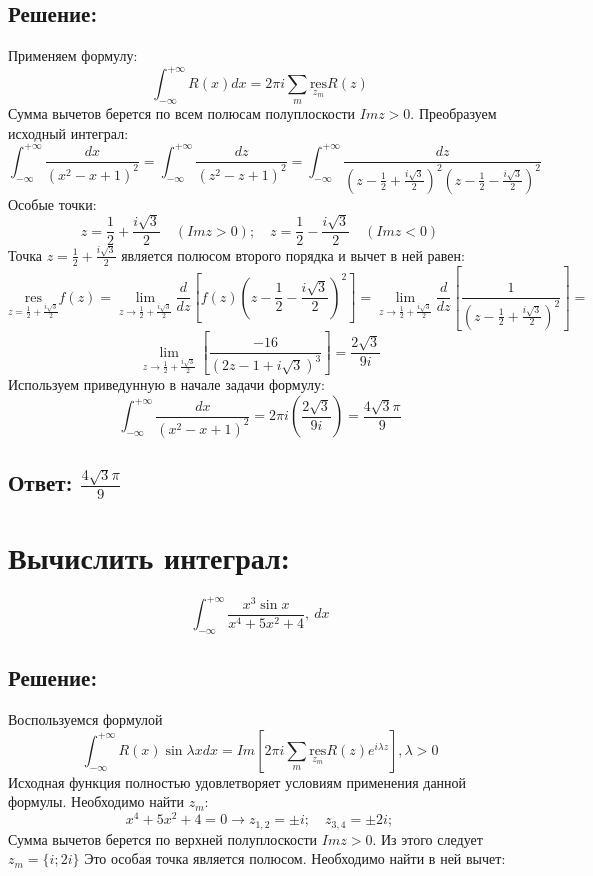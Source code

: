 \documentclass{article}
\begin{document}
	\subsection{Решение:}
	Применяем формулу:
	\[
		\int_{-\infty}^{+\infty}R(x)dx = 2\pi i \sum\limits_{m}\underset{z_m}{\text{res}}
		R(z)
	\]
	Сумма вычетов берется по всем полюсам полуплоскости $Im{z}> 0$. Преобразуем
	исходный интеграл:
	\[
		\int_{-\infty}^{+\infty}\frac{dx}{(x^{2} - x + 1)^{2}}= \int_{-\infty}^{+\infty}
		\frac{dz}{(z^{2} - z + 1)^{2}}= \int_{-\infty}^{+\infty}\frac{dz}{(z - \frac{1}{2}+
		\frac{i\sqrt{3}}{2})^{2} (z - \frac{1}{2}- \frac{i\sqrt{3}}{2})^{2}}
	\]
	Особые точки:
	\[
		z = \frac{1}{2}+ \frac{i\sqrt{3}}{2}\quad (Im{z}> 0); \quad z = \frac{1}{2}-
		\frac{i\sqrt{3}}{2}\quad (Im{z}< 0)
	\]
	Точка $z = \frac{1}{2}+ \frac{i\sqrt{3}}{2}$ является полюсом второго порядка
	и вычет в ней равен:
	\[
		\underset{z = \frac{1}{2} + \frac{i\sqrt{3}}{2}}{\text{res}}f(z) = \lim\limits
		_{z\rightarrow\frac{1}{2} + \frac{i\sqrt{3}}{2}}\frac{d}{dz}\left[f(z)(z - \frac{1}{2}
		- \frac{i\sqrt{3}}{2})^{2} \right] = \lim\limits_{z\rightarrow\frac{1}{2} +
		\frac{i\sqrt{3}}{2}}\frac{d}{dz}\left[\frac{1}{(z - \frac{1}{2}+
		\frac{i\sqrt{3}}{2})^{2}}\right] =
	\]
	\[
		\lim\limits_{z\rightarrow\frac{1}{2} + \frac{i\sqrt{3}}{2}}\left[\frac{-16}{(2z
		- 1 + i\sqrt{3})^{3}}\right] = \frac{2\sqrt{3}}{9i}
	\]
	Используем приведунную в начале задачи формулу:
	\[
		\int_{-\infty}^{+\infty}\frac{dx}{(x^{2} - x + 1)^{2}}= 2\pi i \left(\frac{2\sqrt{3}}{9i}
		\right) = \frac{4\sqrt{3}\pi}{9}
	\]
	\subsection{Ответ: $\frac{4\sqrt{3}\pi}{9}$}

	\vspace{1cm}

	\section{Вычислить интеграл: }
	\[
		\int_{-\infty}^{+\infty}\frac{x^{3}\sin{x}}{x^{4} +5x^{2} + 4},\ dx
	\]
	\subsection{Решение:}
	Воспользуемся формулой
	\[
		\int_{-\infty}^{+\infty}R(x)\sin{\lambda}xdx = Im \left[2\pi i\sum\limits_{m}
		\underset{z_m}{\text{res}}R(z)e^{i\lambda z}\right], \lambda > 0
	\]
	Исходная функция полностью удовлетворяет условиям применения данной формулы. Необходимо
	найти $z_{m}$:
	\[
		x^{4} +5x^{2} + 4 = 0 \rightarrow z_{1,2}= \pm i; \quad z_{3,4}= \pm 2i;
	\]
	Сумма вычетов берется по верхней полуплоскости $Im{z}> 0$. Из этого следует $z_{m}
	= \{i; 2i\}$ Это особая точка является полюсом. Необходимо найти в ней вычет:
\end{document}
